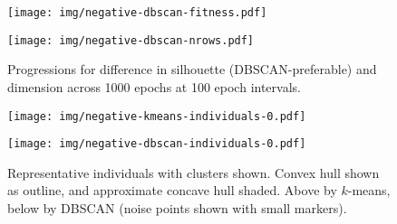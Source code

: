 \begin{figure}[htbp]
    \centering
    \begin{minipage}{\imgwidth}
        \centering
        \texttt{[image: img/negative-dbscan-fitness.pdf]}
    \end{minipage}

    \begin{minipage}{\imgwidth}
        \centering
        \texttt{[image: img/negative-dbscan-nrows.pdf]}
    \end{minipage}
    \caption{Progressions for difference in silhouette (DBSCAN-preferable) and
             dimension across 1000 epochs at 100 epoch
             intervals.}\label{figure:negative-dbscan}
\end{figure}

\begin{figure}[htbp]
    \centering
    \texttt{[image: img/negative-kmeans-individuals-0.pdf]}

    \texttt{[image: img/negative-dbscan-individuals-0.pdf]}
    \caption{Representative individuals with clusters shown. Convex hull shown
             as outline, and approximate concave hull shaded. Above by
             \(k\)-means, below by DBSCAN (noise points shown with small
             markers).}\label{figure:negative-dbscan-individuals}
\end{figure}
